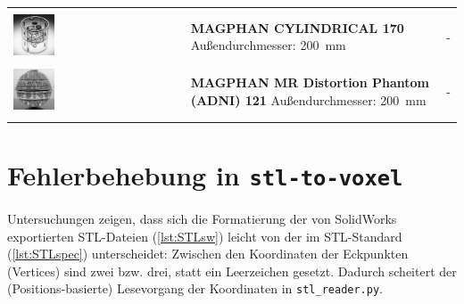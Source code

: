 \begin{table}[H]
\begin{tabularx}{\textwidth}{l X l}
		&&\\
		\includegraphics[width=0.25\textwidth,valign=t]{img/phantoms/Magphan.jpg} & \textbf{MAGPHAN CYLINDRICAL 170} \newline Außendurchmesser: \SI{200}{\mm} \newline \cite{mag170}  & - \\
		&&\\
		\includegraphics[width=0.25\textwidth,valign=t]{img/phantoms/magphan121.jpg} & \textbf{MAGPHAN MR Distortion Phantom (ADNI) 121} \newline Außendurchmesser: \SI{200}{\mm} \newline \cite{mag121} & - \\
		&&\\
		\bottomrule
		\end{tabularx}
		\label{tab:phantomsOverview}
\end{table}
		
\section{Fehlerbehebung in \texttt{stl-to-voxel}}
\label{sec:stlToVoxFix}
Untersuchungen zeigen, dass sich die Formatierung der von SolidWorks exportierten STL-Dateien (\autoref{lst:STLsw}) leicht von der im STL-Standard (\autoref{lst:STLspec}) unterscheidet: Zwischen den Koordinaten der Eckpunkten (Vertices) sind  zwei bzw. drei, statt ein Leerzeichen gesetzt. Dadurch scheitert der (Positions-basierte) Lesevorgang der Koordinaten in \texttt{stl\_reader.py}.


